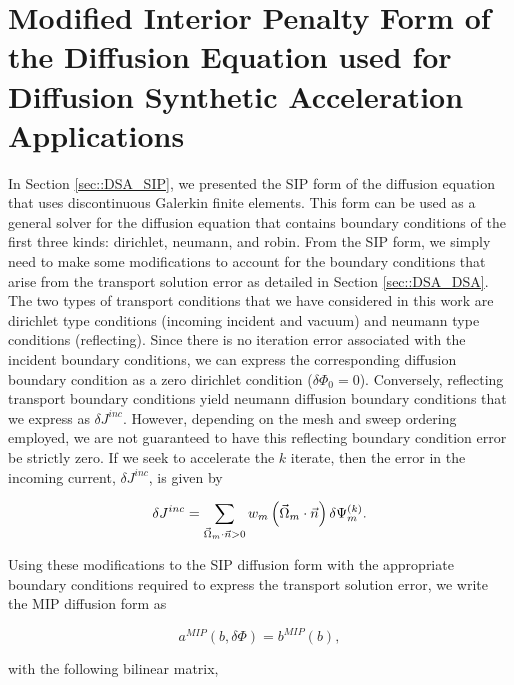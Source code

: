\section{Modified Interior Penalty Form of the Diffusion Equation used for Diffusion Synthetic Acceleration Applications}
\label{sec::DSA_MIP}

In Section \ref{sec::DSA_SIP}, we presented the SIP form of the diffusion equation that uses discontinuous Galerkin finite elements. This form can be used as a general solver for the diffusion equation that contains boundary conditions of the first three kinds: dirichlet, neumann, and robin. From the SIP form, we simply need to make some modifications to account for the boundary conditions that arise from the transport solution error as detailed in Section \ref{sec::DSA_DSA}. The two types of transport conditions that we have considered in this work are dirichlet type conditions (incoming incident and vacuum) and neumann type conditions (reflecting). Since there is no iteration error associated with the incident boundary conditions, we can express the corresponding diffusion boundary condition as a zero dirichlet condition ($\delta \Phi_0 = 0$). Conversely, reflecting transport boundary conditions yield neumann diffusion boundary conditions that we express as $\delta J^{inc}$. However, depending on the mesh and sweep ordering employed, we are not guaranteed to have this reflecting boundary condition error be strictly zero. If we seek to accelerate the $k$ iterate, then the error in the incoming current, $\delta J^{inc}$, is given by

\begin{equation}
\label{eq::MIP_inc_curr_error}
\delta J^{inc} = \sum\displaylimits_{\vec{\Omega}_m \cdot \vec{n} > 0} w_m \left(\vec{\Omega}_m \cdot \vec{n} \right) \delta \Psi_m^{(k)}.
\end{equation}

 \noindent Using these modifications to the SIP diffusion form with the appropriate boundary conditions required to express the transport solution error, we write the MIP diffusion form as

\begin{equation}
a^{MIP}( b, \delta \Phi) = b^{MIP}(b),
\label{eq::MIP_weak_form}
\end{equation}

\noindent with the following bilinear matrix,

